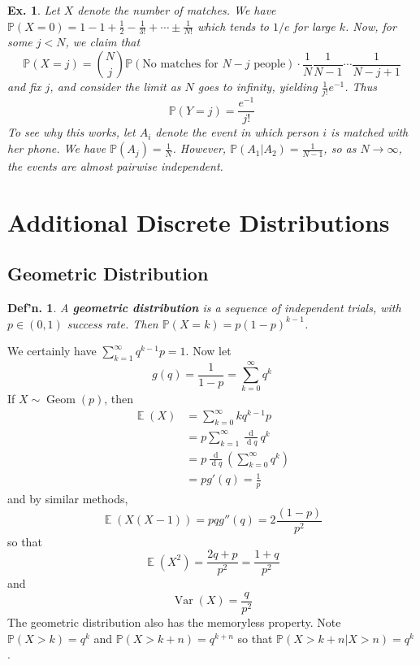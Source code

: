 \documentclass[12pt, a4paper]{book}
\DeclareMathOperator{\E}{\mathbb{E}}
\DeclareMathOperator{\Geom}{Geom}
\DeclareMathOperator{\Var}{Var}
\renewcommand{\Pr}{\mathbb{P}}
\renewcommand{\d}[1]{\ensuremath{\operatorname{d}\!{#1}}} %
\newtheorem{definition}[theorem]{Def'n.}
\newtheorem{example}[theorem]{Ex.}
\theoremstyle{nonumberplain}
\begin{document}
\begin{example}
    Let $X$ denote the number of matches.
    We have $\Pr(X=0)=1-1+\frac{1}{2}-\frac{1}{3!}+\cdots\pm\frac{1}{N!}$ which tends to $1/e$ for large $k$.
    Now, for some $j<N$, we claim that
    \[\Pr(X=j)=\binom{N}{j}\Pr(\text{No matches for $N-j$ people})\cdot\frac{1}{N}\frac{1}{N-1}\cdots\frac{1}{N-j+1}\]
    and fix $j$, and consider the limit as $N$ goes to infinity, yielding $\frac{1}{j!}{e^{-1}}$.
    Thus
    \[\Pr(Y=j)=\frac{e^{-1}}{j!}\]
    To see why this works, let $A_i$ denote the event in which person $i$ is matched with her phone.
    We have $\Pr(A_j)=\frac{1}{N}$.
    However, $\Pr(A_1|A_2)=\frac{1}{N-1}$, so as $N\to\infty$, the events are almost pairwise independent.
\end{example}
\section{Additional Discrete Distributions}
\subsection{Geometric Distribution}
\begin{definition}
    A \textbf{geometric distribution} is a sequence of independent trials, with $p\in(0,1)$ success rate.
    Then $\Pr(X=k)=p(1-p)^{k-1}$.
\end{definition}
We certainly have $\sum\limits_{k=1}^\infty q^{k-1}p=1$.
Now let
\[g(q)=\frac{1}{1-p}=\sum\limits_{k=0}^\infty q^k\]
If $X\sim\Geom(p)$, then
\begin{align*}
    \E(X)&=\sum\limits_{k=0}^\infty kq^{k-1}p\\
         &= p\sum\limits_{k=1}^\infty\frac{\d{}}{\d{q}}q^k\\
         &= p\frac{\d{}}{\d{q}}\left(\sum\limits_{k=0}^\infty q^k\right)\\
         &= pg'(q)=\frac{1}{p}
\end{align*}
and by similar methods,
\[\E(X(X-1))=pqg''(q)=2\frac{(1-p)}{p^2}\]
so that
\[\E(X^2)=\frac{2q+p}{p^2}=\frac{1+q}{p^2}\]
and
\[\Var(X)=\frac{q}{p^2}\]
The geometric distribution also has the memoryless property.
Note $\Pr(X>k)=q^k$ and $\Pr(X>k+n)=q^{k+n}$ so that $\Pr(X>k+n|X>n)=q^k$.
\end{document}
